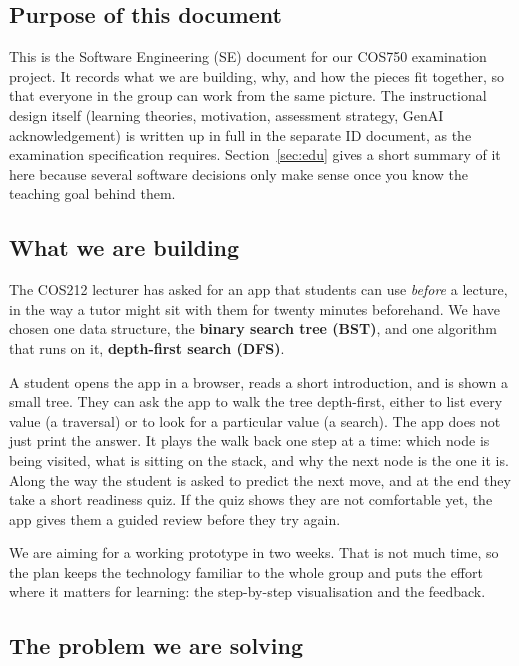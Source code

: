 \documentclass[11pt,a4paper]{article}
\begin{document}
\subsection{Purpose of this document}

This is the Software Engineering (SE) document for our COS750 examination project. It records
what we are building, why, and how the pieces fit together, so that everyone in the group can
work from the same picture. The instructional design itself (learning theories, motivation,
assessment strategy, GenAI acknowledgement) is written up in full in the separate ID document, as
the examination specification requires. Section~\ref{sec:edu} gives a short summary of it here
because several software decisions only make sense once you know the teaching goal behind them.

\subsection{What we are building}

The COS212 lecturer has asked for an app that students can use \emph{before} a lecture, in the
way a tutor might sit with them for twenty minutes beforehand. We have chosen one data structure,
the \textbf{binary search tree (BST)}, and one algorithm that runs on it, \textbf{depth-first
search (DFS)}.

A student opens the app in a browser, reads a short introduction, and is shown a small tree.
They can ask the app to walk the tree depth-first, either to list every value (a traversal) or to
look for a particular value (a search). The app does not just print the answer. It plays the walk
back one step at a time: which node is being visited, what is sitting on the stack, and why the
next node is the one it is. Along the way the student is asked to predict the next move, and at
the end they take a short readiness quiz. If the quiz shows they are not comfortable yet, the app
gives them a guided review before they try again.

We are aiming for a working prototype in two weeks. That is not much time, so the plan keeps the
technology familiar to the whole group and puts the effort where it matters for learning: the
step-by-step visualisation and the feedback.

\subsection{The problem we are solving}
\end{document}
